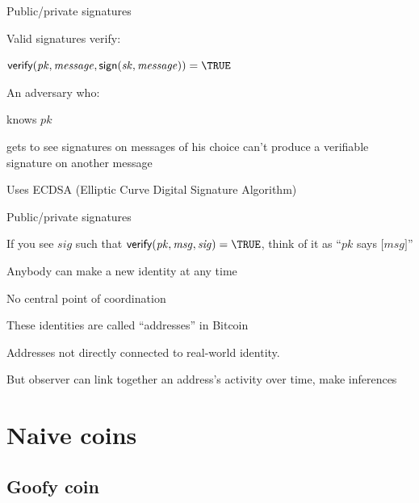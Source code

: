 \begin{frame}{Public/private signatures}
	

\BIL
\item Valid signatures verify:
  \BI
	\item $\textsf{verify}(\mathit{pk}, \mathit{message}, \textsf{sign}(\mathit{sk}, \mathit{message})) = \TRUE$
	\EI
\item An adversary who:
	\BI
	\item knows $\mathit{pk}$
	\item	gets to see signatures on messages of his choice
	\EI
	can't produce a verifiable signature on another message
\EIL

\BI
\item Uses ECDSA (Elliptic Curve Digital Signature Algorithm)
\EI

\end{frame}

\begin{frame}{Public/private signatures}	

\BI
\item If you see $\mathit{sig}$ such that $\textsf{verify}(\mathit{pk}, \mathit{msg}, \mathit{sig})=\TRUE$, think of it as “$\mathit{pk}$ says [$\mathit{msg}]$”
\EI


\BI
\item Anybody can make a new identity at any time
\item No central point of coordination
\item These identities are called “addresses” in Bitcoin
\EI

\BI
\item Addresses not directly connected to real-world identity.
\item But observer can link together an address's activity over time, make inferences
\EI

\end{frame}

\section{Naive coins}
\subsection{Goofy coin}

